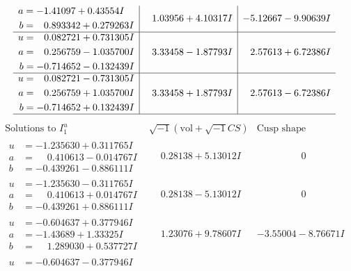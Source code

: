 \documentclass[1p]{elsarticle_modified}
\theoremstyle{definition}
\newcommand{\I}{\sqrt{-1}}
\begin{document}
$$\begin{array}{c|c|c}
\begin{aligned}
a &= -1.41097 + 0.43554 I \\
b &= \phantom{-}0.893342 + 0.279263 I\end{aligned}
 & \phantom{-}1.03956 + 4.10317 I & -5.12667 - 9.90639 I \\ \hline\begin{aligned}
u &= \phantom{-}0.082721 + 0.731305 I \\
a &= \phantom{-}0.256759 - 1.035700 I \\
b &= -0.714652 - 0.132439 I\end{aligned}
 & \phantom{-}3.33458 - 1.87793 I & \phantom{-}2.57613 + 6.72386 I \\ \hline\begin{aligned}
u &= \phantom{-}0.082721 - 0.731305 I \\
a &= \phantom{-}0.256759 + 1.035700 I \\
b &= -0.714652 + 0.132439 I\end{aligned}
 & \phantom{-}3.33458 + 1.87793 I & \phantom{-}2.57613 - 6.72386 I\\
 \hline 
 \end{array}$$\newpage$$\begin{array}{c|c|c}  
\text{Solutions to }I^u_{1}& \I (\text{vol} + \sqrt{-1}CS) & \text{Cusp shape}\\
 \hline 
\begin{aligned}
u &= -1.235630 + 0.311765 I \\
a &= \phantom{-}0.410613 - 0.014767 I \\
b &= -0.439261 - 0.886111 I\end{aligned}
 & \phantom{-}0.28138 + 5.13012 I & \phantom{-0.000000 } 0 \\ \hline\begin{aligned}
u &= -1.235630 - 0.311765 I \\
a &= \phantom{-}0.410613 + 0.014767 I \\
b &= -0.439261 + 0.886111 I\end{aligned}
 & \phantom{-}0.28138 - 5.13012 I & \phantom{-0.000000 } 0 \\ \hline\begin{aligned}
u &= -0.604637 + 0.377946 I \\
a &= -1.43689 + 1.33325 I \\
b &= \phantom{-}1.289030 + 0.537727 I\end{aligned}
 & \phantom{-}1.23076 + 9.78607 I & -3.55004 - 8.76671 I \\ \hline\begin{aligned}
u &= -0.604637 - 0.377946 I \\

\end{aligned}
\end{array}$$
\end{document}
